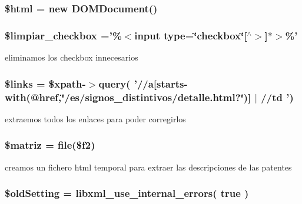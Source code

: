 \hypertarget{accion_8php_a6f96e7fc92441776c9d1cd3386663b40}{
\subsubsection[{\$html}]{\setlength{\rightskip}{0pt plus 5cm}\$html = new D\-O\-M\-Document()}}\label{accion_8php_a6f96e7fc92441776c9d1cd3386663b40}
\hypertarget{accion_8php_ac23882fd8ca5a06313790e9684665860}{
\subsubsection[{\$limpiar\-\_\-checkbox}]{\setlength{\rightskip}{0pt plus 5cm}\$limpiar\-\_\-checkbox ='\%$<$input type=\char`\"{}checkbox\char`\"{}\mbox{[}$^\wedge$$>$\mbox{]}$\ast$$>$\%'}}\label{accion_8php_ac23882fd8ca5a06313790e9684665860}
eliminamos los checkbox innecesarios \hypertarget{accion_8php_a4ca8be3ff3cf95aa3af546449c1f1bec}{
\subsubsection[{\$links}]{\setlength{\rightskip}{0pt plus 5cm}\$links = \$xpath-\/$>$query( '//a\mbox{[}starts-\/with(@href,\char`\"{}/es/signos\-\_\-distintivos/detalle.\-html?\char`\"{})\mbox{]} $|$ //td ')}}\label{accion_8php_a4ca8be3ff3cf95aa3af546449c1f1bec}
extraemos todos los enlaces para poder corregirlos \hypertarget{accion_8php_ab3085040f9b0692adea148136827b8ed}{
\subsubsection[{\$matriz}]{\setlength{\rightskip}{0pt plus 5cm}\$matriz = file(\$f2)}}\label{accion_8php_ab3085040f9b0692adea148136827b8ed}
creamos un fichero html temporal para extraer las descripciones de las patentes \hypertarget{accion_8php_afac1cf670bb0027604bf30d392e071a8}{
\subsubsection[{\$old\-Setting}]{\setlength{\rightskip}{0pt plus 5cm}\$old\-Setting = libxml\-\_\-use\-\_\-internal\-\_\-errors( true )}}\label{accion_8php_afac1cf670bb0027604bf30d392e071a8}
